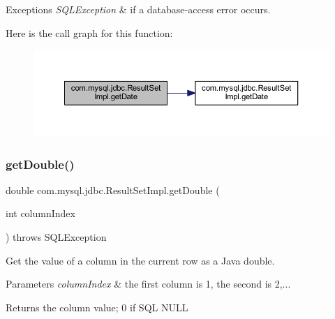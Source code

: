 \begin{DoxyExceptions}{Exceptions}
{\em S\+Q\+L\+Exception} & if a database-\/access error occurs. \\
\hline
\end{DoxyExceptions}
Here is the call graph for this function\+:
\nopagebreak
\begin{figure}[H]
\begin{center}
\leavevmode
\includegraphics[width=350pt]{classcom_1_1mysql_1_1jdbc_1_1_result_set_impl_a0a7bdd217b0d581c313231156b7ec2be_cgraph}
\end{center}
\end{figure}
\mbox{\label{classcom_1_1mysql_1_1jdbc_1_1_result_set_impl_a87d7b2fe049365eabfe54dc800b68ec0}} 
\subsubsection{\texorpdfstring{get\+Double()}{getDouble()}\hspace{0.1cm}{\footnotesize\ttfamily [1/2]}}
{\footnotesize\ttfamily double com.\+mysql.\+jdbc.\+Result\+Set\+Impl.\+get\+Double (\begin{DoxyParamCaption}\item[{int}]{column\+Index }\end{DoxyParamCaption}) throws S\+Q\+L\+Exception}

Get the value of a column in the current row as a Java double.


\begin{DoxyParams}{Parameters}
{\em column\+Index} & the first column is 1, the second is 2,...\\
\hline
\end{DoxyParams}
\begin{DoxyReturn}{Returns}
the column value; 0 if S\+QL N\+U\+LL
\end{DoxyReturn}


